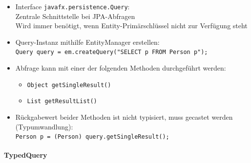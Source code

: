\documentclass[a4paper]{article}
\begin{document}
					\begin{itemize}
						\item Interface \texttt{javafx.persistence.Query}:\\ 
						Zentrale Schnittstelle bei JPA-Abfragen\\
						Wird immer benötigt, wenn Entity-Primärschlüssel nicht zur Verfügung steht
						\item Query-Instanz mithilfe EntityManager erstellen:\\
								\texttt{Query query = em.createQuery("SELECT p FROM Person p");}
						\item Abfrage kann mit einer der folgenden Methoden durchgeführt werden:
						\begin{itemize}
							\item \texttt{Object getSingleResult()}
							\item \texttt{List getResultList()}
						\end{itemize}
						\item Rückgabewert beider Methoden ist nicht typisiert, muss gecastet werden (Typumwandlung):\\
						\texttt{Person p = (Person) query.getSingleResult();}
					\end{itemize}
				
				\paragraph{TypedQuery}
				
\end{document}
